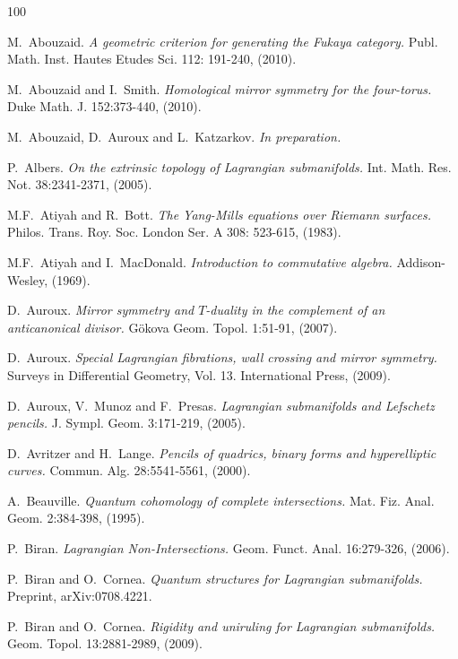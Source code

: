 \documentclass[reqno,10pt]{amsart}
\numberwithin{equation}{section}
\theoremstyle{remark}
\begin{document}

\begin{thebibliography}{100}


M.~Abouzaid.
\emph{A geometric criterion for generating the Fukaya category.}
Publ. Math. Inst. Hautes Etudes Sci. 112: 191-240, (2010).

M.~Abouzaid and I.~Smith.
\emph{Homological mirror symmetry for the four-torus.}
Duke Math. J. 152:373-440, (2010).

M.~Abouzaid, D.~Auroux and L.~Katzarkov.
\emph{In preparation.}

P.~Albers.
\emph{On the extrinsic topology of Lagrangian submanifolds.}
Int. Math. Res. Not. 38:2341-2371, (2005).

M.F.~Atiyah and R.~Bott.
\emph{The Yang-Mills equations over Riemann surfaces.}
Philos. Trans. Roy. Soc. London Ser. A 308: 523-615, (1983).

M.F.~Atiyah and I.~MacDonald.
\emph{Introduction to commutative algebra.}
Addison-Wesley, (1969).

D.~Auroux.
\emph{Mirror symmetry and $T$-duality in the complement of an anticanonical divisor.}
G\"okova Geom. Topol. 1:51-91, (2007).

D.~Auroux.
\emph{Special Lagrangian fibrations, wall crossing and mirror symmetry.}
Surveys in Differential Geometry, Vol. 13. International Press, (2009).

D.~Auroux, V.~Munoz and F.~Presas.
\emph{Lagrangian submanifolds and Lefschetz pencils.}
J. Sympl. Geom. 3:171-219, (2005).

D.~Avritzer and H.~Lange.
\emph{Pencils of quadrics, binary forms and hyperelliptic curves.}
Commun. Alg. 28:5541-5561, (2000).

A.~Beauville.
\emph{Quantum cohomology of complete intersections.}
Mat. Fiz. Anal. Geom. 2:384-398, (1995).


P.~Biran.
\emph{Lagrangian Non-Intersections.}
Geom. Funct. Anal. 16:279-326, (2006).

P.~Biran and O.~Cornea.
\emph{Quantum structures for Lagrangian submanifolds.}
Preprint, arXiv:0708.4221.

P.~Biran and O.~Cornea.
\emph{Rigidity and uniruling for Lagrangian submanifolds.}
Geom. Topol. 13:2881-2989, (2009).


\end{thebibliography}
\end{document}

